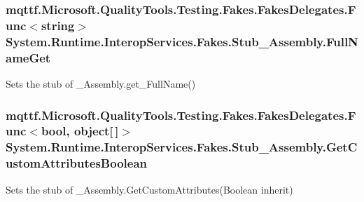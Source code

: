 \hypertarget{class_system_1_1_runtime_1_1_interop_services_1_1_fakes_1_1_stub___assembly_a353c55f2e6ab4ec58232ff26fea6717a}{
\subsubsection[{Full\-Name\-Get}]{\setlength{\rightskip}{0pt plus 5cm}mqttf.\-Microsoft.\-Quality\-Tools.\-Testing.\-Fakes.\-Fakes\-Delegates.\-Func$<$string$>$ System.\-Runtime.\-Interop\-Services.\-Fakes.\-Stub\-\_\-\-Assembly.\-Full\-Name\-Get}}\label{class_system_1_1_runtime_1_1_interop_services_1_1_fakes_1_1_stub___assembly_a353c55f2e6ab4ec58232ff26fea6717a}


Sets the stub of \-\_\-\-Assembly.\-get\-\_\-\-Full\-Name()

\hypertarget{class_system_1_1_runtime_1_1_interop_services_1_1_fakes_1_1_stub___assembly_a83570ec6dc2471136e9acc8a43394738}{
\subsubsection[{Get\-Custom\-Attributes\-Boolean}]{\setlength{\rightskip}{0pt plus 5cm}mqttf.\-Microsoft.\-Quality\-Tools.\-Testing.\-Fakes.\-Fakes\-Delegates.\-Func$<$bool, object\mbox{[}$\,$\mbox{]}$>$ System.\-Runtime.\-Interop\-Services.\-Fakes.\-Stub\-\_\-\-Assembly.\-Get\-Custom\-Attributes\-Boolean}}\label{class_system_1_1_runtime_1_1_interop_services_1_1_fakes_1_1_stub___assembly_a83570ec6dc2471136e9acc8a43394738}


Sets the stub of \-\_\-\-Assembly.\-Get\-Custom\-Attributes(\-Boolean inherit)

